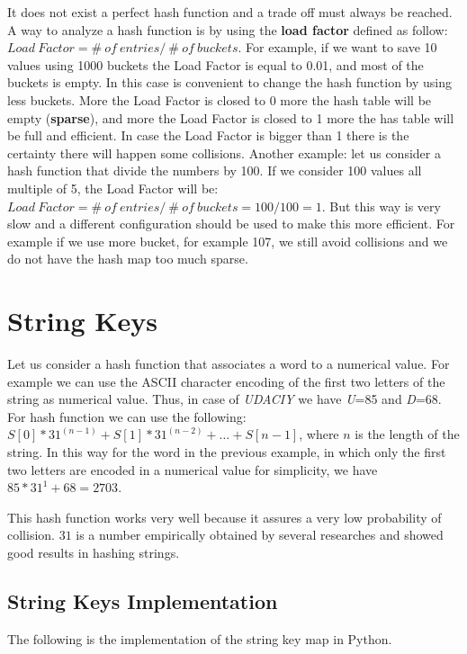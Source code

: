 It does not exist a perfect hash function and a trade off must always be reached. A way to analyze a hash function is by using the \textbf{load factor} defined as follow: \(Load \ Factor = \# \ of \ entries / \ \# \ of \ buckets\). For example, if we want to save 10 values using 1000 buckets the Load Factor is equal to 0.01, and most of the buckets is empty. In this case is convenient to change the hash function by using less buckets. More the Load Factor is closed to 0 more the hash table will be empty (\textbf{sparse}), and more the Load Factor is closed to 1 more the has table will be full and efficient. In case the Load Factor is bigger than 1 there is the certainty there will happen some collisions.
Another example: let us consider a hash function that divide the numbers by 100. If we consider 100 values all multiple of 5, the Load Factor will be: \(Load \ Factor = \# \ of \ entries / \ \# \ of \ buckets = 100/100 = 1\). But this way is very slow and a different configuration should be used to make this more efficient. For example if we use more bucket, for example 107, we still avoid collisions and we do not have the hash map too much sparse.

\section{String Keys}
Let us consider a hash function that associates a word to a numerical value. For example we can use the ASCII character encoding of the first two letters of the string as numerical value. Thus, in case of \textit{UDACIY} we have \textit{U}=85 and \textit{D}=68. For hash function we can use the following: \(S\left[0\right] * 31^{(n-1)} + S\left[1\right] * 31^{(n-2)} + \ldots + S\left[n-1\right]\), where \(n\) is the length of the string. In this way for the word in the previous example, in which only the first two letters are encoded in a numerical value for simplicity, we have \(85*31^{1} + 68 = 2703\).

This hash function works very well because it assures a very low probability of collision. \(31\) is a number empirically obtained by several researches and showed good results in hashing strings.

\subsection{String Keys Implementation}
The following is the implementation of the string key map in Python.


